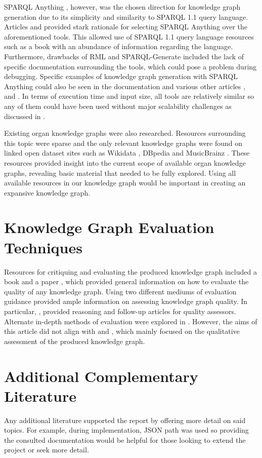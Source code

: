 SPARQL Anything \cite{sparqlanythinggithub}, however, was the chosen direction for knowledge graph generation due to its simplicity and similarity to SPARQL 1.1 query language. Articles \cite{sparqlanything} and \cite{asprino2023knowledge} provided stark rationale for selecting SPARQL Anything over the aforementioned tools. This allowed use of SPARQL 1.1 query language resources such as a book \cite{sparlbook} with an abundance of information regarding the language. Furthermore, drawbacks of RML and SPARQL-Generate included the lack of specific documentation surrounding the tools, which could pose a problem during debugging. Specific examples of knowledge graph generation with SPARQL Anything could also be seen in the documentation \cite{sparqlanythinggithub} and various other articles \cite{sparqlanything}, \cite{asprino2023knowledge} and \cite{rattaknowledge}. In terms of execution time and input size, all tools are relatively similar so any of them could have been used without major scalability challenges as discussed in \cite{sparqlanything}. 

Existing organ knowledge graphs were also researched. Resources surrounding this topic were sparse and the only relevant knowledge graphs were found on linked open dataset sites such as Wikidata \cite{organwikidata}, DBpedia \cite{organdbpedia} and MusicBrainz \cite{organmusicbrainz}. These resources provided insight into the current scope of available organ knowledge graphs, revealing basic material that needed to be fully explored. Using all available resources in our knowledge graph would be important in creating an expansive knowledge graph.

\section{Knowledge Graph Evaluation Techniques}
\hspace{0.5cm} Resources for critiquing and evaluating the produced knowledge graph included a book \cite{knowledgegraphevaulationbook} and a paper \cite{evaluationpaper}, which provided general information on how to evaluate the quality of any knowledge graph. Using two different mediums of evaluation guidance provided ample information on assessing knowledge graph quality. In particular, \cite{evaluationpaper}, provided reasoning and follow-up articles for quality assessors. Alternate in-depth methods of evaluation were explored in \cite{gao2019efficient}. However, the aims of this article did not align with \cite{knowledgegraphevaulationbook} and \cite{evaluationpaper}, which mainly focused on the qualitative assessment of the produced knowledge graph. 

\section{Additional Complementary Literature}
\hspace{0.5cm} Any additional literature supported the report by offering more detail on said topics. For example, during implementation, JSON path was used so providing the consulted documentation \cite{jsonpath} would be helpful for those looking to extend the project or seek more detail. 
